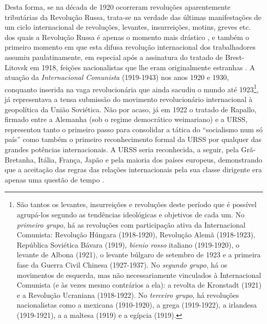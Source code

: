 Desta forma, se na década de 1920 ocorreram revoluções aparentemente tributárias da Revolução Russa, trata-se na verdade das últimas manifestações de um ciclo internacional de revoluções, levantes, insurreições, motins, greves etc. dos quais a Revolução Russa é apenas o momento mais drástico \cite[p.~616]{bernardo_fascismo_2015}, e também o primeiro momento em que esta difusa revolução internacional dos trabalhadores assumiu paulatinamente, em especial após a assinatura do tratado de Brest-Litovsk em 1918, feições nacionalistas que lhe eram originalmente estranhas \cite[p.~618-620]{bernardo_fascismo_2015}. A atuação da \textit{Internacional Comunista} (1919-1943) nos anos 1920 e 1930, conquanto inserida na vaga revolucionária que ainda sacudiu o mundo até 1923\footnote{São tantos os levantes, insurreições e revoluções deste período que é possível agrupá-los segundo as tendências ideológicas e objetivos de cada um. No \textit{primeiro grupo}, há as revoluções com participação ativa da Internacional Comunista: Revolução Húngara (1918-1920), Revolução Alemã (1918-1923), República Soviética Bávara (1919), \textit{bienio rosso} italiano (1919-1920), o levante de Albona (1921), o levante búlgaro de setembro de 1923 e a primeira fase da Guerra Civil Chinesa (1927-1937). No \textit{segundo grupo}, há os movimentos de esquerda, mas não necessariamente vinculados à Internacional Comunista (e às vezes mesmo contrários a ela): a revolta de Kronstadt (1921) e a Revolução Ucraniana (1918-1922). No \textit{terceiro grupo}, há revoluções nacionalistas como a mexicana (1910-1920), a grega (1919-1922), a irlandesa (1919-1921), a a maltesa (1919) e a egípcia (1919).}, já representava a tensa submissão do movimento revolucionário internacional à geopolítica da União Soviética. Não por acaso, já em 1922 o tratado de Rapallo, firmado entre a Alemanha (sob o regime democrático weimariano) e a URSS, representou tanto o primeiro passo para consolidar a tática do ``socialismo num só país'' como também o primeiro reconhecimento formal da URSS por qualquer das grandes potências internacionais. A URSS seria reconhecida, a seguir, pela Grã-Bretanha, Itália, França, Japão e pela maioria dos países europeus, demonstrando que a aceitação das regras das relações internacionais pela sua classe dirigente era apenas uma questão de tempo \cite[p.~72-77]{carr_relations_1937}.


